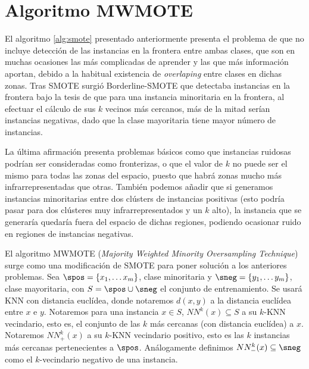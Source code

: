 \label{ch:algs}
\section{Algoritmo MWMOTE}
El algoritmo \ref{alg:smote} presentado anteriormente presenta el problema de que no incluye detección de
las instancias en la frontera entre ambas clases, que son en muchas ocasiones las más complicadas de aprender y las que más
información aportan, debido a la habitual existencia de \textit{overlaping} entre clases en dichas zonas. Tras SMOTE surgió
Borderline-SMOTE que detectaba instancias en la frontera bajo la tesis de que para una instancia minoritaria en la frontera,
al efectuar el cálculo de sus $k$ vecinos más cercanos, más de la mitad serían instancias negativas, dado que la
clase mayoritaria tiene mayor número de instancias.

La última afirmación presenta problemas básicos como que instancias ruidosas podrían ser consideradas como fronterizas, o que
el valor de $k$ no puede ser el mismo para todas las zonas del espacio, puesto que habrá zonas mucho más infrarrepresentadas
que otras. También podemos añadir que si generamos instancias minoritarias entre dos clústers de instancias positivas (esto 
podría pasar para dos clústeres muy infrarrepresentados y un $k$ alto), la instancia que se generaría quedaría fuera del 
espacio de dichas regiones, podiendo ocasionar ruido en regiones de instancias negativas.

El algoritmo MWMOTE (\textit{Majority Weighted Minority Oversampling Technique}) surge como una modificación de SMOTE para poner 
solución a los anteriores problemas. Sea $\spos = \{x_1, \ldots x_m\}$, clase minoritaria y $\sneg = \{y_1, \ldots y_m\}$, 
clase mayoritaria, con $S= \spos \cup \sneg$ el conjunto de entrenamiento. Se usará KNN con distancia euclídea, donde notaremos
$d(x,y)$ a la distancia euclídea entre $x$ e $y$. Notaremos para una instancia $x\in S$, $NN^{k}(x)\subseteq S$ a su $k$-KNN vecindario, 
esto es, el conjunto de las $k$ más cercanas (con distancia euclídea) a $x$. Notaremos $NN_{+}^k(x)$ a su $k$-KNN vecindario 
positivo, esto es las $k$ instancias más cercanas pertenecientes a $\spos$. Análogamente definimos $NN_{-}^k(x) \subseteq \sneg$ 
como el $k$-vecindario negativo de una instancia.

